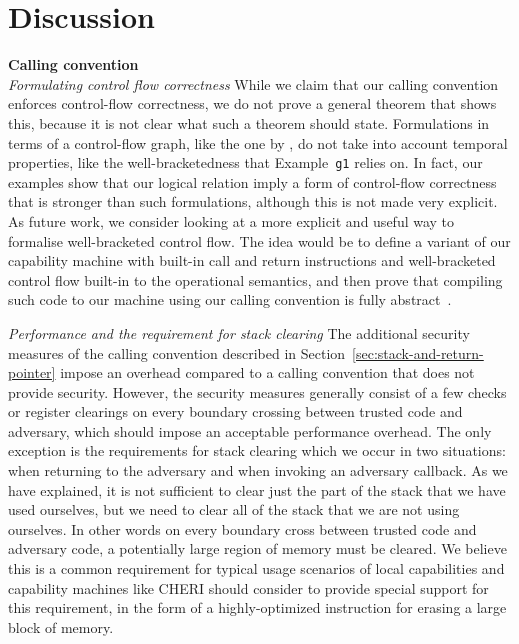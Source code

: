 \documentclass[compsoc,conference,letterpaper,fleqn]{IEEEtran}
\begin{document}
\section{Discussion}
\label{sec:discussion}
\noindent\textbf{Calling convention}\\
\emph{Formulating control flow correctness} While we claim that our calling convention enforces control-flow
correctness, we do not prove a general theorem that shows this, because it is not clear what such a theorem should state. Formulations in terms of a control-flow graph, like the one by
\cite{abadi_control-flow_2005}, do not take into account temporal properties,
like the well-bracketedness that Example~\texttt{\footnotesize{g1}} relies on.
In fact, our examples show that our logical relation imply a form of
control-flow correctness that is stronger than such formulations, although this
is not made very explicit. As future work, we consider looking at a more
explicit and useful way to formalise well-bracketed control flow. The idea would
be to define a variant of our capability machine with built-in call and return
instructions and well-bracketed control flow built-in to the operational
semantics, and then prove that compiling such code to our machine using our
calling convention is fully abstract~\cite{abadi_protection_1998}.

\emph{Performance and the requirement for stack clearing} 
The additional security measures of the calling convention described in
Section~\ref{sec:stack-and-return-pointer} impose an overhead compared to
a calling convention that does not provide security. However, the security measures generally consist of a
few checks or register clearings on every boundary crossing between trusted code
and adversary, which should impose an acceptable performance overhead. The only
exception is the requirements for stack clearing which we occur in two
situations: when returning to the adversary and when invoking an adversary
callback. As we have explained, it is not sufficient to clear just the part of
the stack that we have used ourselves, but we need to clear all of the stack that we are not using ourselves. 
In other words on every boundary cross between trusted code and adversary code, a potentially large region of memory must be cleared.
We believe this is a common requirement for typical usage scenarios of local capabilities and
capability machines like CHERI should consider to provide special support for
this requirement, in the form of a highly-optimized instruction for erasing
a large block of memory.
\end{document}
